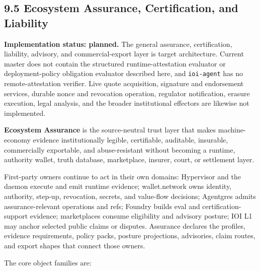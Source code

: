 \documentclass[
  11pt,
]{article}
\begin{document}
\hypertarget{ecosystem-assurance-certification-and-liability}{%
\subsection{9.5 Ecosystem Assurance, Certification, and
Liability}\label{ecosystem-assurance-certification-and-liability}}

\textbf{Implementation status: planned.} The general assurance,
certification, liability, advisory, and commercial-export layer is target
architecture. Current master does not contain the structured
runtime-attestation evaluator or deployment-policy obligation evaluator
described here, and \texttt{ioi-agent} has no remote-attestation verifier.
Live quote acquisition, signature and endorsement services, durable nonce and
revocation operation, regulator notification, erasure execution, legal
analysis, and the broader institutional effectors are likewise not
implemented.

\textbf{Ecosystem Assurance} is the source-neutral trust layer that makes
machine-economy evidence institutionally legible, certifiable, auditable,
insurable, commercially exportable, and abuse-resistant without becoming a
runtime, authority wallet, truth database, marketplace, insurer, court, or
settlement layer.

First-party owners continue to act in their own domains: Hypervisor and the
daemon execute and emit runtime evidence; wallet.network owns identity, authority,
step-up, revocation, secrets, and value-flow decisions; Agentgres admits
assurance-relevant operations and refs; Foundry builds eval and
certification-support evidence; marketplaces consume eligibility and
advisory posture; IOI L1 may anchor selected public claims or disputes.
Assurance declares the profiles, evidence requirements, policy packs,
posture projections, advisories, claim routes, and export shapes that connect
those owners.

The core object families are:
\end{document}
